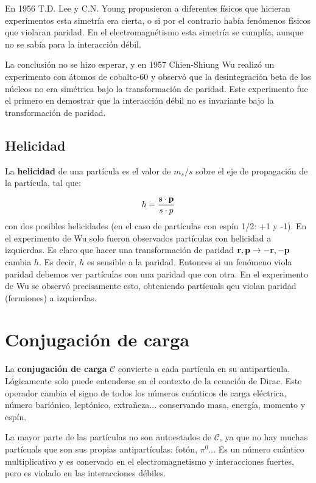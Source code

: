 En 1956 T.D. Lee y C.N. Young propusieron a diferentes físicos que hicieran experimentos esta simetría era cierta, o si por el contrario había fenómenos físicos que violaran paridad. En el electromagnétismo esta simetría se cumplía, aunque no se sabía para la interacción débil.

La conclusión no se hizo esperar, y en 1957 Chien-Shiung Wu realizó un experimento con átomos de cobalto-60 y observó que la desintegración beta de los núcleos no era simétrica bajo la transformación de paridad. Este experimento fue el primero en demostrar que la interacción débil no es invariante bajo la transformación de paridad. 

\subsection{Helicidad}

La \textbf{helicidad} de una partícula es el valor de $m_s/s$ sobre el eje de propagación de la partícula, tal que:

\begin{equation}
    h = \frac{\mathbf{s} \cdot \mathbf{p}}{s \cdot  p}
\end{equation}
con dos posibles helicidades (en el caso de partículas con espín 1/2: +1 y -1). En el experimento de Wu solo fueron observados partículas con helicidad a izquierdas. Es claro que hacer una transformación de paridad $\mathbf{r},\mathbf{p} \to -\mathbf{r},-\mathbf{p}$ cambia $h$. Es decir, $h$ es sensible a la paridad. Entonces si un fenómeno viola paridad debemos ver partículas con una paridad que con otra. En el experimento de Wu se observó precisamente esto, obteniendo partícuals qeu violan paridad (fermiones) a izquierdas.

\section{Conjugación de carga}

La \textbf{conjugación de carga} $\mathcal{C}$ convierte a cada partícula en su antipartícula. Lógicamente solo puede entenderse en el contexto de la ecuación de Dirac. Este operador cambia el signo de todos los números cuánticos de carga eléctrica, número bariónico, leptónico, extrañeza... conservando masa, energía, momento y espín. 

La mayor parte de las partículas no son autoestados de $\mathcal{C}$, ya que no hay muchas partícuals que son sus propias antipartículas: fotón, $\pi^0$... Es un número cuántico multiplicativo y es conervado en el electromagnetismo  y interacciones fuertes, pero es violado en las interacciones débiles. 

